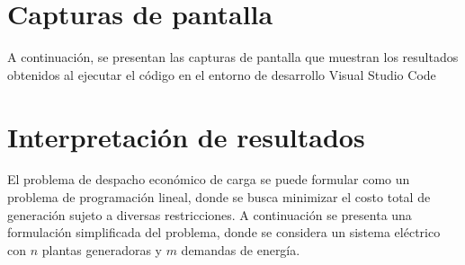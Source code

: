 \documentclass[11pt]{article}
\begin{document}
\newpage
\section{Capturas de pantalla}
A continuación, se presentan las capturas de pantalla que muestran los resultados obtenidos al ejecutar el código en el entorno de desarrollo Visual Studio Code

\newpage
\section{Interpretación de resultados}	
El problema de despacho económico de carga se puede formular como un problema de programación lineal, donde se busca minimizar el costo total de generación sujeto a diversas restricciones. A continuación se presenta una formulación simplificada del problema, donde se considera un sistema eléctrico con $n$ plantas generadoras y $m$ demandas de energía.

\newpage
\end{document}
